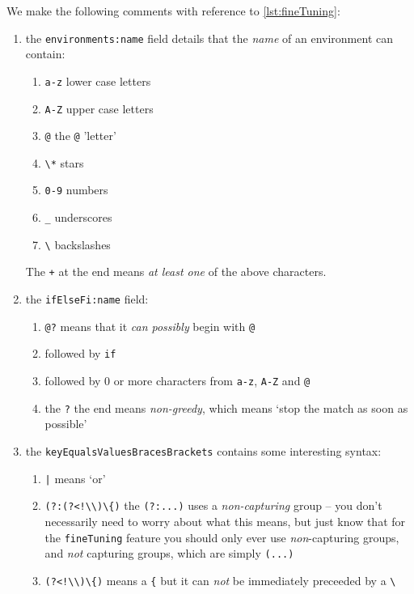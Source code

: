 We make the following comments with reference to \cref{lst:fineTuning}:
\begin{enumerate}
	\item the \texttt{environments:name} field details that the \emph{name} of an environment can contain:
	      \begin{enumerate}
		      \item \texttt{a-z} lower case letters
		      \item \texttt{A-Z} upper case letters
		      \item \texttt{@} the \texttt{@} 'letter'
		      \item \lstinline!\*! stars
		      \item \texttt{0-9} numbers
		      \item \lstinline!_! underscores
		      \item \lstinline!\! backslashes
	      \end{enumerate}
	      The \texttt{+} at the end means \emph{at least one} of the above characters.
	\item the \texttt{ifElseFi:name} field:
	      \begin{enumerate}
		      \item \lstinline^@?^ means that it \emph{can possibly} begin with \lstinline^@^
		      \item followed by \texttt{if}
		      \item followed by 0 or more characters from \texttt{a-z}, \texttt{A-Z} and \texttt{@}
              \item the \texttt{?} the end means \emph{non-greedy}, which means `stop the match as soon as possible'
	      \end{enumerate}
	\item the \texttt{keyEqualsValuesBracesBrackets} contains some interesting syntax:
	      \begin{enumerate}
		      \item \lstinline!|! means `or'
		      \item \lstinline^(?:(?<!\\)\{)^ the \lstinline^(?:...)^ uses a \emph{non-capturing} group -- you don't necessarily need to worry about
		            what this means, but just know that for the \texttt{fineTuning} feature you should only ever use
		            \emph{non}-capturing groups, and \emph{not} capturing groups, which are simply \lstinline!(...)!
		      \item \lstinline^(?<!\\)\{)^ means a \lstinline^{^ but it can \emph{not} be immediately preceeded by a \lstinline!\!

\end{enumerate}
\end{enumerate}
